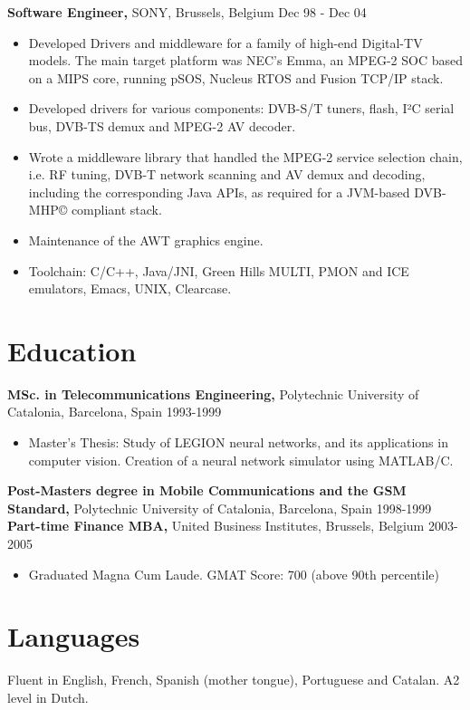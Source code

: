 \documentclass[margin]{res}
\begin{document}
\begin{resume}
{\bf Software Engineer,} SONY, Brussels, Belgium \hfill  Dec 98 - Dec 04
\begin{itemize} \itemsep -2pt %
\item Developed Drivers and middleware for a family of high-end Digital-TV models. The main target platform was NEC’s Emma, an MPEG-2 SOC based on a MIPS core, running pSOS, Nucleus RTOS and Fusion TCP/IP stack.
\item Developed drivers for various components: DVB-S/T tuners, flash, I²C serial bus, DVB-TS demux and MPEG-2 AV decoder.
\item Wrote a middleware library that handled the MPEG-2 service selection chain, i.e. RF tuning, DVB-T network scanning and AV demux and decoding, including the corresponding Java APIs, as required for a JVM-based DVB-MHP© compliant stack.
\item Maintenance of the AWT graphics engine.
\item Toolchain: C/C++, Java/JNI, Green Hills MULTI, PMON and ICE emulators, Emacs, UNIX, Clearcase.
\end{itemize}

\section{Education}
{ \bf MSc. in Telecommunications Engineering, } Polytechnic University of Catalonia, Barcelona, Spain \hfill 1993-1999
\begin{itemize} \itemsep -2pt
\item Master’s Thesis: Study of LEGION neural networks, and its applications in computer vision. Creation of a neural network simulator using MATLAB/C.
\end{itemize}

{ \bf Post-Masters degree in Mobile Communications and the GSM Standard, } Polytechnic University of Catalonia, Barcelona, Spain \hfill 1998-1999
\pagebreak
{ \bf Part-time Finance MBA, } United Business Institutes, Brussels, Belgium \hfill 2003-2005
\begin{itemize} \itemsep -2pt
\item Graduated Magna Cum Laude. GMAT Score: 700 (above 90th percentile)
\end{itemize}

\section{Languages}
Fluent in English, French, Spanish (mother tongue), Portuguese and Catalan. \newline
A2 level in Dutch.


\end{resume}
\end{document}
